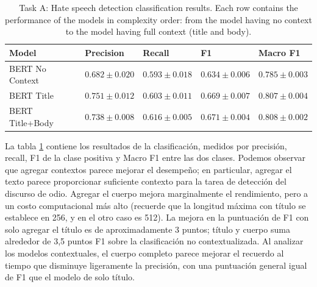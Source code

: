 \begin{table}[ht!]
    \centering
    \begin{tabular}{lllll}
        \toprule
        Model &          Precision &             Recall &                 F1 &           Macro F1 \\
        \midrule
        BERT No Context &  $0.682 \pm 0.020$ &  $0.593 \pm 0.018$ &  $0.634 \pm 0.006$ &  $0.785 \pm 0.003$ \\
        BERT Title      &  $0.751 \pm 0.012$ &  $0.603 \pm 0.011$ &  $0.669 \pm 0.007$ &  $0.807 \pm 0.004$ \\
        BERT Title+Body &  $0.738 \pm 0.008$ &  $0.616 \pm 0.005$ &  $0.671 \pm 0.004$ &  $0.808 \pm 0.002$ \\
        \bottomrule
    \end{tabular}


    \caption{Task A: Hate speech detection classification results. Each row contains the performance of the models in complexity order: from the model having no context to the model having full context (title and body). }
    \label{tab:task_a_results}
\end{table}


La tabla \ref{tab:task_a_results} contiene los resultados de la clasificación, medidos por precisión, recall, F1 de la clase positiva y Macro F1 entre las dos clases. Podemos observar que agregar contextos parece mejorar el desempeño; en particular, agregar el texto parece proporcionar suficiente contexto para la tarea de detección del discurso de odio. Agregar el cuerpo mejora marginalmente el rendimiento, pero a un costo computacional más alto (recuerde que la longitud máxima con título se establece en 256, y en el otro caso es 512). La mejora en la puntuación de F1 con solo agregar el título es de aproximadamente 3 puntos; título y cuerpo suma alrededor de 3,5 puntos F1 sobre la clasificación no contextualizada. Al analizar los modelos contextuales, el cuerpo completo parece mejorar el recuerdo al tiempo que disminuye ligeramente la precisión, con una puntuación general igual de F1 que el modelo de solo título.

